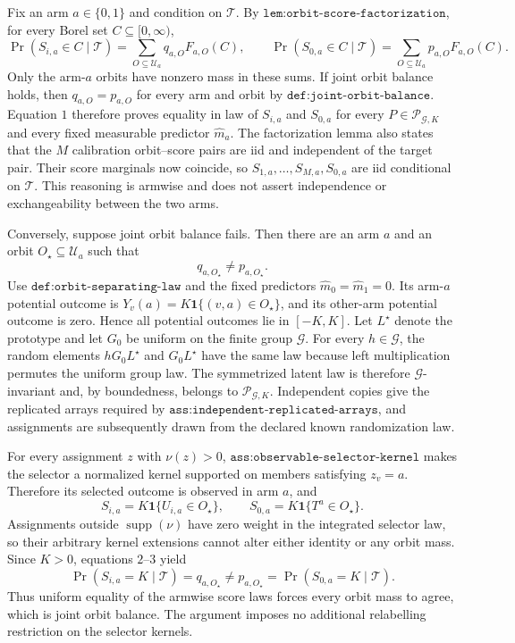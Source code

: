 Fix an arm \(a\in\{0,1\}\) and condition on \(\mathcal T\). By \(\texttt{lem:orbit-score-factorization}\), for every Borel set \(C\subseteq[0,\infty)\),
\[
\Pr(S_{i,a}\in C\mid\mathcal T)=\sum_{O\subseteq\mathcal U_a}q_{a,O}F_{a,O}(C),\qquad
\Pr(S_{0,a}\in C\mid\mathcal T)=\sum_{O\subseteq\mathcal U_a}p_{a,O}F_{a,O}(C).\tag{1}
\]
Only the arm-\(a\) orbits have nonzero mass in these sums. If joint orbit balance holds, then \(q_{a,O}=p_{a,O}\) for every arm and orbit by \(\texttt{def:joint-orbit-balance}\). Equation \(1\) therefore proves equality in law of \(S_{i,a}\) and \(S_{0,a}\) for every \(P\in\mathcal P_{\mathcal G,K}\) and every fixed measurable predictor \(\widehat m_a\). The factorization lemma also states that the \(M\) calibration orbit--score pairs are iid and independent of the target pair. Their score marginals now coincide, so \(S_{1,a},\ldots,S_{M,a},S_{0,a}\) are iid conditional on \(\mathcal T\). This reasoning is armwise and does not assert independence or exchangeability between the two arms.

Conversely, suppose joint orbit balance fails. Then there are an arm \(a\) and an orbit \(O_\star\subseteq\mathcal U_a\) such that
\[
q_{a,O_\star}\ne p_{a,O_\star}.\tag{2}
\]
Use \(\texttt{def:orbit-separating-law}\) and the fixed predictors \(\widehat m_0=\widehat m_1=0\). Its arm-\(a\) potential outcome is \(Y_v(a)=K\mathbf 1\{(v,a)\in O_\star\}\), and its other-arm potential outcome is zero. Hence all potential outcomes lie in \([-K,K]\). Let \(L^\star\) denote the prototype and let \(G_0\) be uniform on the finite group \(\mathcal G\). For every \(h\in\mathcal G\), the random elements \(hG_0L^\star\) and \(G_0L^\star\) have the same law because left multiplication permutes the uniform group law. The symmetrized latent law is therefore \(\mathcal G\)-invariant and, by boundedness, belongs to \(\mathcal P_{\mathcal G,K}\). Independent copies give the replicated arrays required by \(\texttt{ass:independent-replicated-arrays}\), and assignments are subsequently drawn from the declared known randomization law.

For every assignment \(z\) with \(\nu(z)>0\), \(\texttt{ass:observable-selector-kernel}\) makes the selector a normalized kernel supported on members satisfying \(z_v=a\). Therefore its selected outcome is observed in arm \(a\), and
\[
S_{i,a}=K\mathbf 1\{U_{i,a}\in O_\star\},\qquad
S_{0,a}=K\mathbf 1\{T^a\in O_\star\}.\tag{3}
\]
Assignments outside \(\operatorname{supp}(\nu)\) have zero weight in the integrated selector law, so their arbitrary kernel extensions cannot alter either identity or any orbit mass. Since \(K>0\), equations \(2\)--\(3\) yield
\[
\Pr(S_{i,a}=K\mid\mathcal T)=q_{a,O_\star}\ne p_{a,O_\star}=\Pr(S_{0,a}=K\mid\mathcal T).
\]
Thus uniform equality of the armwise score laws forces every orbit mass to agree, which is joint orbit balance. The argument imposes no additional relabelling restriction on the selector kernels.

